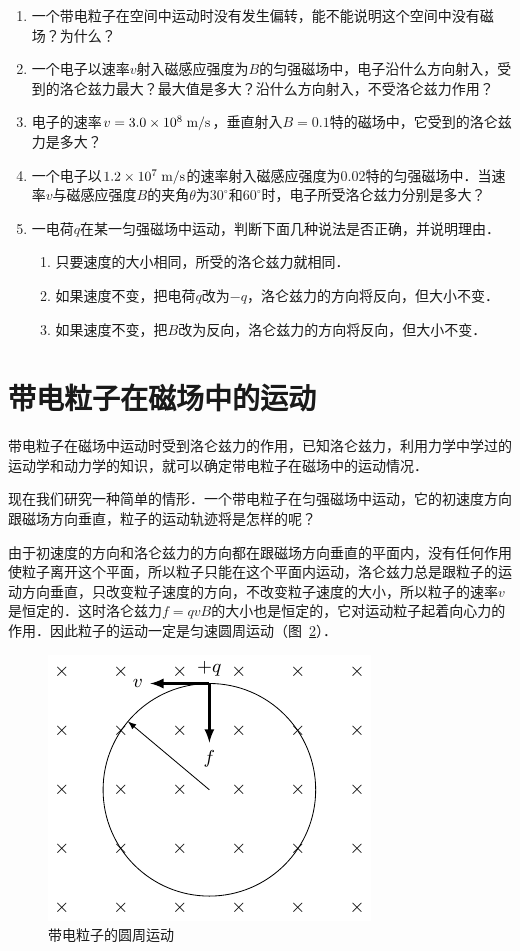 \begin{enumerate}
\begin{figure}[htbp]
        \caption{}\label{fig_C_1-35}
    \end{figure}
    \item 一个带电粒子在空间中运动时没有发生偏转，能不能说明这个空间中没有磁场？为什么？
    \item 一个电子以速率$v$射入磁感应强度为$B$的匀强磁场中，电子沿什么方向射入，受到的洛仑兹力最大？最大值是多大？沿什么方向射入，不受洛仑兹力作用？
    \item 电子的速率$v=3.0\times10^8\;\text{m}/\text{s}$，垂直射入$B=0.1$特的磁场中，它受到的洛仑兹力是多大？
    \item 一个电子以$1.2\times10^7\;\text{m}/\text{s}$的速率射入磁感应强度为0.02特的匀强磁场中．当速率$v$与磁感应强度$B$的夹角$\theta$为$30^{\circ}$和$60^{\circ}$时，电子所受洛仑兹力分别是多大？
    \item 一电荷$q$在某一匀强磁场中运动，判断下面几种说法是否正确，并说明理由．
\begin{enumerate}
    \item 只要速度的大小相同，所受的洛仑兹力就相同．
    \item 如果速度不变，把电荷$q$改为$-q$，洛仑兹力的方向将反向，但大小不变．
    \item 如果速度不变，把$B$改为反向，洛仑兹力的方向将反向，但大小不变．
\end{enumerate}

\end{enumerate}


\section{带电粒子在磁场中的运动}
带电粒子在磁场中运动时受到洛仑兹力的作用，已知洛仑兹力，利用力学中学过的运动学和动力学的知识，就可以确定带电粒子在磁场中的运动情况．

现在我们研究一种简单的情形．一个带电粒子在匀强磁场中运动，它的初速度方向跟磁场方向垂直，粒子的运动轨迹将是怎样的呢？

由于初速度的方向和洛仑兹力的方向都在跟磁场方向垂直的平面内，没有任何作用使粒子离开这个平面，所以粒子只能在这个平面内运动，洛仑兹力总是跟粒子的运动方向垂直，只改变粒子速度的方向，不改变粒子速度的大小，所以粒子的速率$v$是恒定的．这时洛仑兹力$f=qvB$的大小也是恒定的，它对运动粒子起着向心力的作用．因此粒子的运动一定是匀速圆周运动（图~\ref{fig_C_1-36}）．
\begin{figure}[htbp]
    \centering
    \includegraphics{fig/C/1-36.pdf}
    \caption{带电粒子的圆周运动}\label{fig_C_1-36}
\end{figure}

